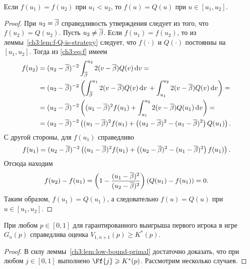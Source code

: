 {\begin{lemma}
  \label{ch3:lem:f=Q}
  Если $f(u_1) = f(u_2)$ при $u_1 < u_2$, то $f(u) = Q(u)$ при $u \in [u_1, u_2]$.
\end{lemma}
\begin{proof}
  При $u_2 = {{\overline{\beta}}}$ справедливость утверждения следует из того, что $f(u_2) = Q(u_2)$.
  Пусть $u_2 \neq {{\overline{\beta}}}$. 
  Если $f(u_1) = f(u_2)$, то из леммы~\ref{ch3:lem:f-Q-is-strategy} следует, что $f(\cdot)$ и $Q(\cdot)$ постоянны на $[u_1, u_2]$.
  Тогда из \eqref{ch3:eq:f} имеем
  \begin{align*}
    f(u_2)
    &= (u_2 - {{\overline{\beta}}})^{-2} \int_{{{\overline{\beta}}}}^{u_2} 2 (v - {{\overline{\beta}}}) Q(v) \mathop{}\!\mathrm{d} v = \\
    &= (u_2 - {{\overline{\beta}}})^{-2} \left(
      \int_{{{\overline{\beta}}}}^{u_1} 2 (v - {{\overline{\beta}}}) Q(v) \mathop{}\!\mathrm{d} v \, +
      \int_{u_1}^{u_2} 2 (v - {{\overline{\beta}}}) Q(v) \mathop{}\!\mathrm{d} v
      \right) = \\
    &= (u_2 - {{\overline{\beta}}})^{-2} \left(
      (u_1 - {{\overline{\beta}}})^2 f(u_1) +
      \int_{u_1}^{u_2} 2 (v - {{\overline{\beta}}}) Q(u_1) \mathop{}\!\mathrm{d} v
      \right) = \\
    &= (u_2 - {{\overline{\beta}}})^{-2} \left(
      (u_1 - {{\overline{\beta}}})^2 f(u_1) +
      \left( (u_2 - {{\overline{\beta}}})^2 - (u_1 - {{\overline{\beta}}})^2 \right) Q(u_1)
      \right).
  \end{align*}
  С другой стороны, для $f(u_1)$ справедливо
  \begin{equation*}
    f(u_1) = (u_2 - {{\overline{\beta}}})^{-2} \left(
      (u_1 - {{\overline{\beta}}})^2 f(u_1) +
      \left( (u_2 - {{\overline{\beta}}})^2 - (u_1 - {{\overline{\beta}}})^2 \right) f(u_1)
    \right).
  \end{equation*}
  Отсюда находим
  \begin{equation*}
    f(u_2) - f(u_1) = \left(1 - \frac{(u_1 - {{\overline{\beta}}})^2}{(u_2 - {{\overline{\beta}}})^2}\right)(Q(u_1) - f(u_1)) = 0.
  \end{equation*}
  Таким образом, $f(u_1) = Q(u_1)$, а следовательно $f(u) = Q(u)$ при $u \in [u_1, u_2]$.
\end{proof}

\begin{theorem}\label{ch3:thm:V-bound}
  При любом $p \in [0, 1]$ для гарантированного выигрыша первого игрока в игре $G_n(p)$ справедлива оценка $V_{1,n+1}(p) \geqslant K^*(p)$.
\end{theorem}
\begin{proof}
  В силу леммы~\ref{ch3:lem:low-bound-primal} достаточно доказать, что при любом $j \in [0, 1]$ выполнено $\Ff{j} \geqslant K^*(p)$.
  Рассмотрим несколько случаев.


\end{proof}}
